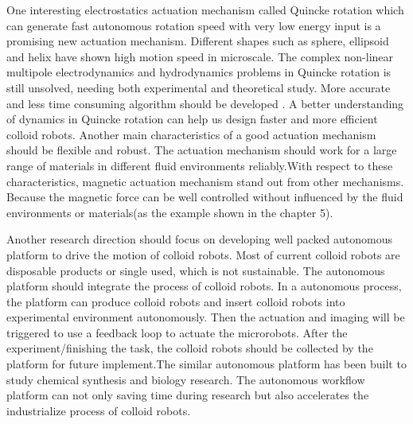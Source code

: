 One interesting electrostatics actuation mechanism called Quincke rotation which can generate fast autonomous rotation speed with very low energy input is a promising new actuation mechanism. \cite{das2013electrohydrodynamic} Different shapes such as sphere, ellipsoid and helix have shown high motion speed in microscale.\cite{brosseau2019relating,das2019active} The complex non-linear multipole electrodynamics and hydrodynamics problems in Quincke rotation is still unsolved, needing both experimental and theoretical study. More accurate  and  less time consuming algorithm should be developed . \cite{fiore2019fast}  A better understanding of dynamics in Quincke rotation can help us design faster and more efficient colloid robots. Another main characteristics of a good actuation mechanism  should be flexible and robust. The actuation mechanism should work for a large range of materials in different fluid environments reliably.With respect to these characteristics,  magnetic actuation mechanism stand out from other mechanisms. Because the magnetic force can be well controlled without influenced by the fluid environments or materials(as the example shown in the chapter 5).

Another research direction should focus on developing well packed autonomous platform to drive the motion of colloid  robots. Most of current colloid robots are disposable products or single used, which is not sustainable. The autonomous platform should integrate the process of colloid robots. In a autonomous process, the platform can produce colloid robots and insert colloid robots into experimental environment autonomously. Then the actuation and imaging will be triggered to  use a feedback loop to actuate the microrobots. After the experiment/finishing the task, the colloid robots should be collected by the platform for future implement.The similar autonomous platform has been built to study chemical synthesis and biology research. \cite{grizou2020curious,chao2019systems} The autonomous workflow platform can not only saving time during research but also accelerates the industrialize process of colloid robots.   

